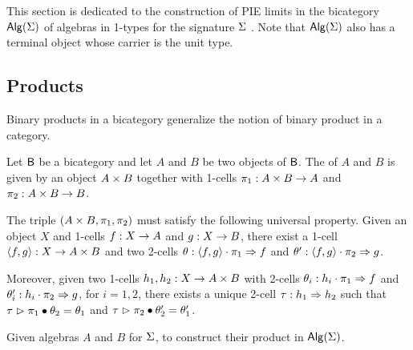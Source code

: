 This section is dedicated to the construction of PIE limits in the
bicategory $\mathsf{Alg}(\Sigma)$ of algebras in 1-types for the signature
$\Sigma$ \cite{power1991characterization}.
Note that $\mathsf{Alg}(\Sigma)$ also has a terminal object whose carrier is the unit type.

\subsection{Products}

Binary products in a bicategory generalize the notion of binary
product in a category.

\begin{definition}\label{def:product}
Let $\mathsf{B}$ be a bicategory and let $A$ and $B$ be two objects of
$\mathsf{B}$. The  of $A$ and $B$ is given by an object $A \times B$ together with 1-cells $\pi_1 : A \times B \rightarrow A$ and
$\pi_2 : A \times B \rightarrow B$.

The triple $(A \times B,\pi_1, \pi_2)$ must satisfy the following
universal property. Given an object $X$ and 1-cells $f : X
\rightarrow A$ and $g : X \rightarrow B$, there exist a 1-cell
$\langle f , g \rangle : X \rightarrow A \times B$ and two 2-cells $\theta :
\langle f , g \rangle \cdot \pi_1 \Rightarrow f$ and $\theta' : \langle f , g \rangle
\cdot \pi_2 \Rightarrow g$.

Moreover, given two 1-cells $h_1,h_2 : X \rightarrow A \times B$ with
2-cells $\theta_i : h_i \cdot \pi_1 \Rightarrow f$ and $\theta'_i : h_i
\cdot \pi_2 \Rightarrow g$, for $i= 1,2$, there exists a unique
2-cell $\tau : h_1 \Rightarrow h_2$ such that $\tau \vartriangleright
\pi_1 \bullet \theta_2 = \theta_1$ and $\tau \vartriangleright \pi_2 \bullet
\theta'_2 = \theta'_1$.
\end{definition} 

\begin{problem}
\label{prob:product}
Given algebras $A$ and $B$ for $\Sigma$, to construct their product in $\mathsf{Alg}(\Sigma)$.
\end{problem}

